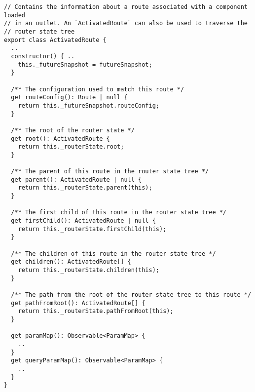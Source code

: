 \begin{verbatim}
// Contains the information about a route associated with a component loaded
// in an outlet. An `ActivatedRoute` can also be used to traverse the
// router state tree
export class ActivatedRoute {
  ..
  constructor() { ..
    this._futureSnapshot = futureSnapshot;
  }

  /** The configuration used to match this route */
  get routeConfig(): Route | null {
    return this._futureSnapshot.routeConfig;
  }

  /** The root of the router state */
  get root(): ActivatedRoute {
    return this._routerState.root;
  }

  /** The parent of this route in the router state tree */
  get parent(): ActivatedRoute | null {
    return this._routerState.parent(this);
  }

  /** The first child of this route in the router state tree */
  get firstChild(): ActivatedRoute | null {
    return this._routerState.firstChild(this);
  }

  /** The children of this route in the router state tree */
  get children(): ActivatedRoute[] {
    return this._routerState.children(this);
  }

  /** The path from the root of the router state tree to this route */
  get pathFromRoot(): ActivatedRoute[] {
    return this._routerState.pathFromRoot(this);
  }

  get paramMap(): Observable<ParamMap> {
    ..
  }
  get queryParamMap(): Observable<ParamMap> {
    ..
  }
}
\end{verbatim}
